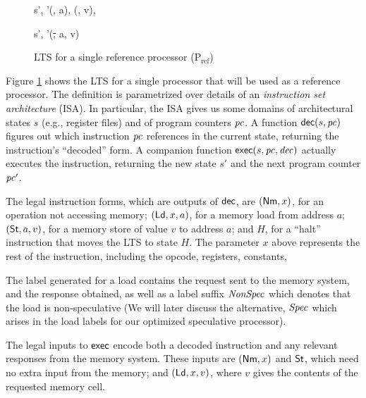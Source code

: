 \begin{figure}
\small
\centering
\begin{boxedminipage}[c]{.48\textwidth}
{}

{}

{
{s', \pc'}{(\ld\req, a), (\ld\resp, v), \Real}}

{
{s', \pc'}{(\st, a, v)}}
\end{boxedminipage}

\caption{LTS for a single reference processor (P$_{\text{ref}}$)}
\label{Pref$}
\end{figure}


Figure \ref{Pref$} shows the LTS for a single processor that will be used as a
reference processor.  The definition is parametrized over details of an
\emph{instruction set architecture} (ISA).  In particular, the ISA gives us
some domains of architectural states $s$ (e.g., register files) and of program
counters $\pc$.  A function $\dec(s, \pc)$ figures out which instruction $\pc$
references in the current state, returning the instruction's ``decoded'' form.
A companion function $\exec(s, \pc, \mathit{dec})$ actually executes the
instruction, returning the new state $s'$ and the next program counter $\pc'$.

The legal instruction forms, which are outputs of $\mathsf{dec}$, are $(\mathsf{Nm}, x)$, for
an operation not accessing memory; $(\mathsf{Ld}, x, a)$, for a memory load from
address $a$; $(\mathsf{St}, a, v)$, for a memory store of value $v$ to address $a$; and
$H$, for a ``halt'' instruction that moves the LTS to state $H$. The parameter
$x$ above represents the rest of the instruction, including the opcode,
registers, constants, \etc{}

The label generated for a load contains the request sent to the
memory system, and the response obtained, as well as a label suffix $\mathit{NonSpec}$
which denotes that the load is non-speculative (We will later discuss the
alternative, $\mathit{Spec}$ which arises in the load labels for our optimized
speculative processor).

The legal inputs to $\mathsf{exec}$ encode both a decoded instruction and any relevant
responses from the memory system.  These inputs are $(\mathsf{Nm}, x)$ and $\mathsf{St}$, which
need no extra input from the memory; and $(\mathsf{Ld}, x, v)$, where $v$ gives the
contents of the requested memory cell.

